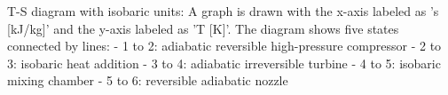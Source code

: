 T-S diagram with isobaric units:  
A graph is drawn with the x-axis labeled as 's [kJ/kg]' and the y-axis labeled as 'T [K]'. The diagram shows five states connected by lines:  
- 1 to 2: adiabatic reversible high-pressure compressor  
- 2 to 3: isobaric heat addition  
- 3 to 4: adiabatic irreversible turbine  
- 4 to 5: isobaric mixing chamber  
- 5 to 6: reversible adiabatic nozzle